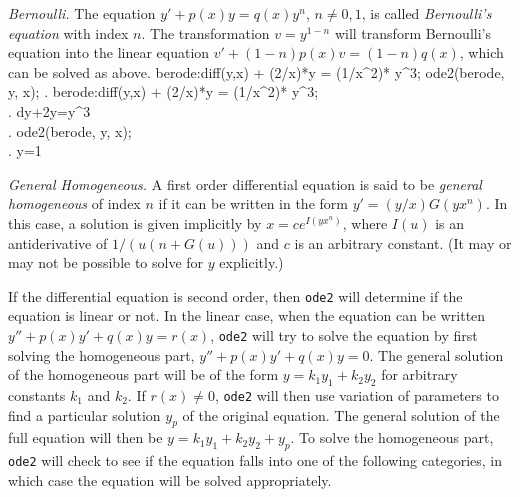 \documentclass{article}
\begin{document}
\smallskip

\noindent
\textit{Bernoulli.}\quad
The equation $y'+p(x)y=q(x)y^n$, $n \ne 0,1$, is called
\textit{Bernoulli's equation} with index $n$. The transformation
$v=y^{1-n}$ will transform Bernoulli's equation into the linear
equation $v' + (1-n)p(x)v = (1-n)q(x)$, which can be solved as above. 
\beginmaximasession
berode:diff(y,x) + (2/x)*y = (1/x^2)* y^3;
ode2(berode, y, x);
\maximatexsession
{}.  berode:diff(y,x) + (2/x)*y = (1/x^2)* y^3; \\
.   {{d}}\*y+{{2\*y}}={{y^{3}}} \\
.  ode2(berode, y, x); \\
.   y={{1}} \\
\endmaximasession

\smallskip

\noindent
\textit{General Homogeneous.}\quad
A first order differential equation is said to be \textit{general
  homogeneous} of index $n$ if it can be written in the form $y' =
(y/x)G(yx^n)$.  In this case, a solution is given implicitly by
$x=ce^{I(yx^n)}$, where $I(u)$ is an antiderivative of $1/(u(n+G(u)))$
and $c$ is an arbitrary constant. (It may or may not be possible to
solve for $y$ explicitly.)

\medskip

If the differential equation is second order, then \texttt{ode2} will
determine if the equation is linear or not.  In the linear case,
when the equation can be written $y'' + p(x)y' + q(x)y = r(x)$,
\texttt{ode2} will try to solve the equation by first solving the
homogeneous part, $y'' + p(x)y' + q(x)y = 0$.
The general solution of the homogeneous part
will be of the form $y = k_1y_1 + k_2y_2$ for arbitrary constants $k_1$ and
$k_2$.  If $r(x) \ne 0$, \texttt{ode2} will then use variation of
parameters to find a particular solution $y_p$ of the original
equation.  The general solution of the full equation will then be 
$y=k_1y_1 + k_2y_2 + y_p$.
To solve the homogeneous part, \texttt{ode2} will check to see if the
equation falls into one of the following categories, in which case 
the equation will be solved appropriately.

\medskip
\end{document}
